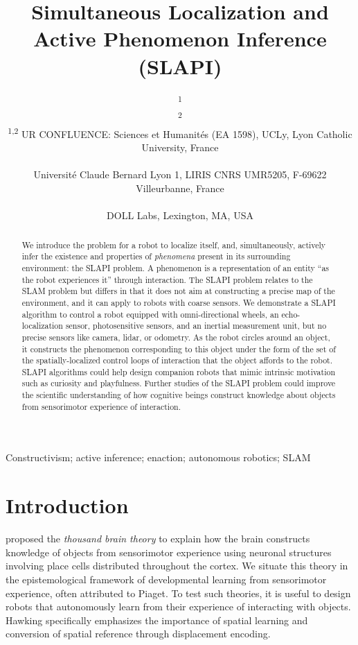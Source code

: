 \documentclass[pmlr]{jmlr}%
\title[SLAPI]{Simultaneous Localization and Active Phenomenon Inference (SLAPI)}
\author{\Name{Olivier L. Georgeon}\textsuperscript{1} \Email{ogeorgeon@univ-catholyon.fr}\\
  \Name{Juan R. Vidal}\textsuperscript{2} \Email{jvidal@univ-catholyon.fr}\\
  \addr \textsuperscript{1,2} UR CONFLUENCE: Sciences et Humanités (EA 1598), UCLy, Lyon Catholic University, France\\
  \Name{Titouan Knockaert} \Email{titouan.knockaert@gmail.com}\\
  \addr Université Claude Bernard Lyon 1, LIRIS CNRS UMR5205, F-69622 Villeurbanne, France\\
  \Name{Paul Robertson} \Email{paulr@dollabs.com}\\
  \addr DOLL Labs, Lexington, MA, USA\\
}
\begin{document}
\maketitle

\begin{abstract}
We introduce the problem for a robot to  localize itself, and, simultaneously, actively infer the existence and properties of \textit{phenomena} present in its surrounding environment: the SLAPI problem. 
A phenomenon is a representation of an entity ``as the robot experiences it'' through interaction. 
The SLAPI problem relates to the SLAM problem but differs in that it does not aim at constructing a precise map of the environment, and it can apply to robots with coarse sensors. 
We demonstrate a SLAPI algorithm to control a robot equipped with omni-directional wheels, an echo-localization sensor, photosensitive sensors, and an inertial measurement unit, but no precise sensors like camera, lidar, or odometry. 
As the robot circles around an object, it constructs the phenomenon corresponding to this object under the form of the set of the spatially-localized control loops of interaction that the object affords to the robot. 
SLAPI algorithms could help design companion robots that mimic intrinsic motivation such as curiosity and playfulness. 
Further studies of the SLAPI problem could improve the scientific understanding of how cognitive beings construct knowledge about objects from sensorimotor experience of interaction.
\end{abstract}

\begin{keywords}
Constructivism; active inference; enaction; autonomous robotics; SLAM
\end{keywords}

\section{Introduction}
\label{sec:intro}

\cite{hawkins_framework_2019} proposed the \textit{thousand brain theory} to explain how the brain constructs knowledge of objects from sensorimotor experience using neuronal structures involving place cells distributed throughout the cortex.
We situate this theory in the epistemological framework of developmental learning from sensorimotor experience, often attributed to Piaget.
To test such theories, it is useful to design robots that autonomously learn from their experience of interacting with objects.
Hawking specifically emphasizes the importance of spatial learning and conversion of spatial reference through displacement encoding. 
\end{document}
